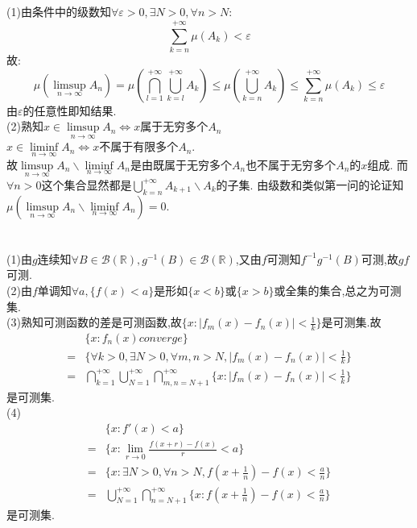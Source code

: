 \documentclass[]{article}
\title{}
\author{}
\begin{document}
\maketitle

\section{}
(1)由条件中的级数知$\forall \varepsilon>0,\exists N>0,\forall n>N:$
$$\sum_{k=n}^{+\infty}\mu(A_k)<\varepsilon$$故:
$$\mu(\limsup\limits_{n\rightarrow \infty}A_n)=\mu(\bigcap_{l=1}^{+\infty}\bigcup_{k=l}^{+\infty}A_k)\leq \mu(\bigcup_{k=n}^{+\infty}A_k)\leq\sum_{k=n}^{+\infty}\mu(A_k)\leq\varepsilon$$
由$\varepsilon$的任意性即知结果.\\
(2)熟知$x\in \limsup\limits_{n\rightarrow \infty}A_n\iff x$属于无穷多个$A_n$\\
$x\in \liminf\limits_{n\rightarrow \infty}A_n\iff x$不属于有限多个$A_n$.\\
故$\limsup\limits_{n\rightarrow \infty}A_n\backslash\liminf\limits_{n\rightarrow \infty}A_n$是由既属于无穷多个$A_n$也不属于无穷多个$A_n$的$x$组成.
而$\forall n>0$这个集合显然都是$\bigcup_{k=n}^{+\infty}A_{k+1}\backslash A_k$的子集.
由级数和类似第一问的论证知$\mu(\limsup\limits_{n\rightarrow \infty}A_n\backslash\liminf\limits_{n\rightarrow \infty}A_n)=0$.


\section{}
\noindent(1)由$g$连续知$\forall B \in \mathcal{B}(\mathbb{R}),g^{-1}(B)\in \mathcal{B}(\mathbb{R})$,又由$f$可测知$f^{-1}g^{-1}(B)$可测,故$gf$可测.\\
(2)由$f$单调知$\forall a,\{f(x)<a\}$是形如$\{x<b\}$或$\{x>b\}$或全集的集合,总之为可测集.\\
(3)熟知可测函数的差是可测函数,故$\{x:|f_m(x)-f_n(x)|<\frac{1}{k}\}$是可测集.故
\begin{equation}
	\begin{aligned}
		&\{x:f_n(x)converge\}\\=&
		\{\forall k>0,\exists N>0,\forall m,n>N,|f_m(x)-f_n(x)|<\frac{1}{k}\}
		\\=&\bigcap_{k=1}^{+\infty}\bigcup_{N=1}^{+\infty}\bigcap_{m,n=N+1}^{+\infty}\{x:|f_m(x)-f_n(x)|<\frac{1}{k}\}
	\end{aligned}
\end{equation}
是可测集.\\
(4)\begin{equation}
	\begin{aligned}
		&\{x:f'(x)<a\}\\=&
		\{x:\lim\limits_{r\rightarrow 0}\frac{f(x+r)-f(x)}{r}<a\}\\=&
		\{x:\exists N>0,\forall n>N,f(x+\frac{1}{n})-f(x)<\frac{a}{n}\}\\=&
		\bigcup_{N=1}^{+\infty}\bigcap_{n=N+1}^{+\infty}\{x:f(x+\frac{1}{n})-f(x)<\frac{a}{n}\}
	\end{aligned}
\end{equation}
是可测集.
\end{document}
